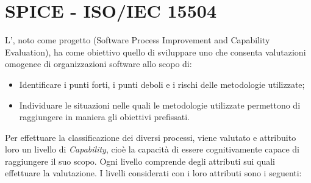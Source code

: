 \appendix
\section{SPICE - ISO/IEC 15504}  \label{spice}
L', noto come progetto  (Software Process Improvement and Capability Evaluation), ha come obiettivo quello di sviluppare uno  che consenta valutazioni omogenee di organizzazioni software allo scopo di:
\begin{itemize}
	\item Identificare i punti forti, i punti deboli e i rischi delle metodologie utilizzate;
	\item Individuare le situazioni nelle quali le metodologie utilizzate permettono di raggiungere in maniera  gli obiettivi prefissati.
\end{itemize}
Per effettuare la classificazione dei diversi processi, viene valutato e attribuito loro un livello di \textit{Capability}, cioè la capacità di essere cognitivamente capace di raggiungere il suo scopo. 
Ogni livello comprende degli attributi sui quali effettuare la valutazione.
I livelli considerati con i loro attributi sono i seguenti:

